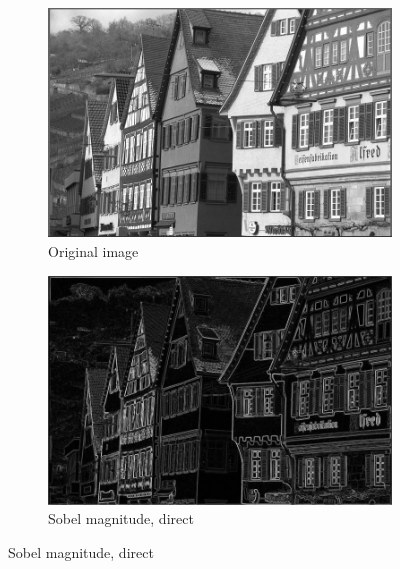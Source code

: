 \documentclass[12pt]{amsart}
\theoremstyle{definition}
\theoremstyle{remark}
\numberwithin{thm}{section}
\begin{document}
\begin{figure}[h] \centering 
\begin{subfigure}[b]{0.4\textwidth} \includegraphics[width=\textwidth]{german.jpg} \caption{Original image} %
\end{subfigure}
\begin{subfigure}[b]{0.4\textwidth} \includegraphics[width=\textwidth]{german0.jpg} \caption{Sobel magnitude, direct}\end{subfigure}


\end{figure}
\end{document}
